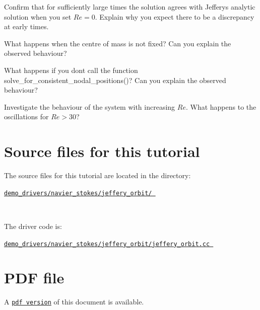 \begin{DoxyEnumerate}
\item Confirm that for sufficiently large times the solution agrees with Jeffery\textquotesingle{}s analytic solution when you set $ Re=0 $. Explain why you expect there to be a discrepancy at early times.~\newline
~\newline

\item What happens when the centre of mass is not fixed? Can you explain the observed behaviour?~\newline
~\newline

\item What happens if you don\textquotesingle{}t call the function {\ttfamily solve\+\_\+for\+\_\+consistent\+\_\+nodal\+\_\+positions()}? Can you explain the observed behaviour?~\newline
~\newline

\item Investigate the behaviour of the system with increasing $Re$. What happens to the oscillations for $ Re > 30 $?~\newline
~\newline

\end{DoxyEnumerate}

 

\hypertarget{index_sources}{}\section{Source files for this tutorial}\label{index_sources}

\begin{DoxyItemize}
\item The source files for this tutorial are located in the directory\+:~\newline
~\newline
\begin{center} \href{../../../../demo_drivers/navier_stokes/jeffery_orbit/}{\tt demo\+\_\+drivers/navier\+\_\+stokes/jeffery\+\_\+orbit/ } \end{center} ~\newline

\item The driver code is\+: ~\newline
~\newline
\begin{center} \href{../../../../demo_drivers/navier_stokes/jeffery_orbit/jeffery_orbit.cc}{\tt demo\+\_\+drivers/navier\+\_\+stokes/jeffery\+\_\+orbit/jeffery\+\_\+orbit.\+cc } \end{center} 
\end{DoxyItemize}

 

 \hypertarget{index_pdf}{}\section{P\+D\+F file}\label{index_pdf}
A \href{../latex/refman.pdf}{\tt pdf version} of this document is available. 
